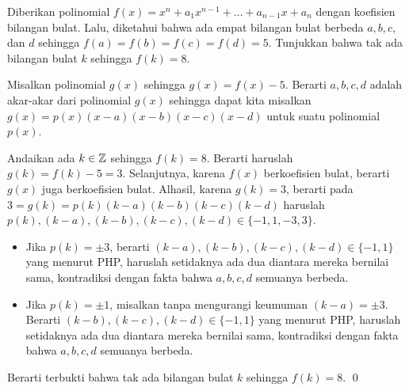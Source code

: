 \documentclass[12pt]{scrartcl}
\begin{document}
	\begin{soalbaru} 
		Diberikan polinomial $f(x)=x^n+a_1x^{n-1}+\dots+a_{n-1}x+a_n$ dengan koefisien bilangan bulat. Lalu, diketahui bahwa ada empat bilangan bulat berbeda $a,b,c,$ dan $d$ sehingga $f(a)=f(b)=f(c)=f(d)=5$. Tunjukkan bahwa tak ada bilangan bulat $k$ sehingga $f(k)=8$.
		\\[-10pt]
				\begin{solusi}
				Misalkan polinomial $g(x)$ sehingga $g(x)=f(x)-5$. Berarti $a,b,c,d$ adalah akar-akar dari polinomial $g(x)$ sehingga dapat kita misalkan $g(x)=p(x)(x-a)(x-b)(x-c)(x-d)$ untuk suatu polinomial $p(x)$.
				
				Andaikan ada $k \in \mathbb Z$ sehingga $f(k)=8$. Berarti haruslah $g(k)=f(k)-5=3$. Selanjutnya, karena $f(x)$ berkoefisien bulat, berarti $g(x)$ juga berkoefisien bulat. Alhasil, karena $g(k)=3$, berarti pada $3=g(k)=p(k)(k-a)(k-b)(k-c)(k-d)$ haruslah \\$p(k), (k-a), (k-b), (k-c), (k-d) \in \{-1,1,-3,3\}.$
				
				\begin{itemize}
				\item Jika $p(k)=\pm 3$, berarti $(k-a), (k-b), (k-c), (k-d) \in \{-1,1\}$ yang menurut PHP, haruslah setidaknya ada dua diantara mereka bernilai sama, kontradiksi dengan fakta bahwa $a,b,c,d$ semuanya berbeda.
								
				\item Jika $p(k)=\pm 1$, misalkan tanpa mengurangi keumuman $(k-a)=\pm3$. Berarti $(k-b), (k-c), (k-d) \in \{-1,1\}$ yang menurut PHP, haruslah setidaknya ada dua diantara mereka bernilai sama, kontradiksi dengan fakta bahwa $a,b,c,d$ semuanya berbeda.
				\end{itemize}
				
				Berarti terbukti bahwa tak ada bilangan bulat $k$ sehingga $f(k)=8$. \qed
				\end{solusi}
	\end{soalbaru}
	\newpage
\end{document}
